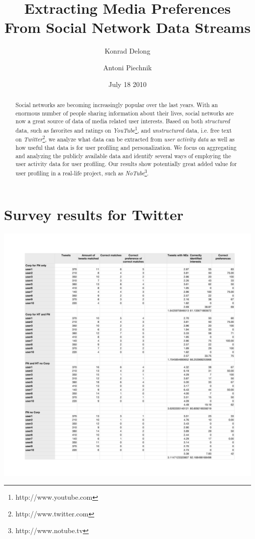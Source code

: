 \documentclass{article}
\def\ie{{i.e. }}
\begin{document}
\title{\textbf{Extracting Media Preferences From Social Network Data Streams}}
\author{Konrad Delong \and Antoni Piechnik}
\date{July 18 2010}

\maketitle

\begin{abstract} Social networks are becoming increasingly popular over the last
years. With an enormous number of people sharing information about their lives,
social networks are now a great source of data of media related user interests. Based on both
\textit{structured} data, such as favorites and ratings on \textit{YouTube}\footnote{http://www.youtube.com},
and \textit{unstructured} data, \ie free text on \textit{Twitter}\footnote{http://www.twitter.com},
we analyze what data can be extracted from \textit{user activity data} as well as how useful that data
is for user profiling and personalization. We focus on aggregating and analyzing the publicly available
data and identify several ways of employing the user activity data for user profiling.
Our results show potentially great added value for user profiling in a real-life project, such as \textit{NoTube}\footnote{http://www.notube.tv}.

\end{abstract}




















\appendix
\section{Survey results for Twitter}
\label{app:twitter_polls}
\includegraphics[scale=0.45]{images/results_polls_twitter.pdf}
\end{document}
